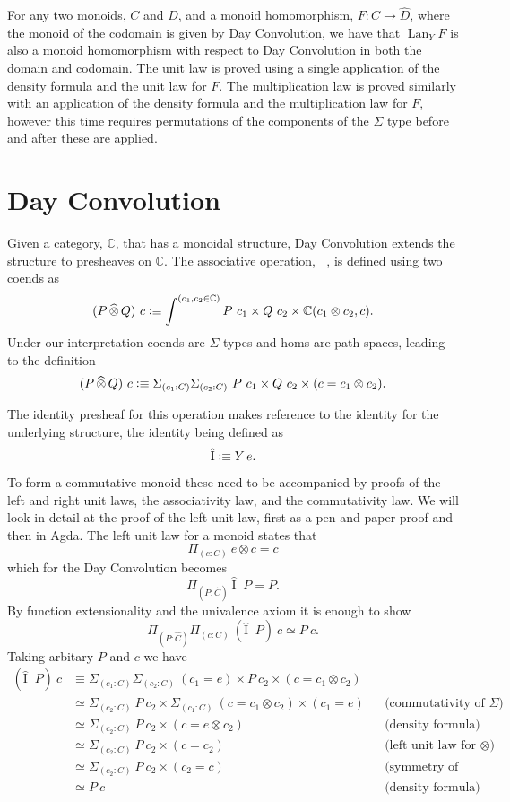 \documentclass[12pt, parskip, DIV=14]{scrbook}
\newcommand{\defeq}{\vcentcolon\equiv}
\DeclareMathOperator\daytensor{\widehat\otimes}
\newcommand{\dayid}{\operatorname{\hat{I}}}
\newcommand{\Lan}{\operatorname{Lan}}
\begin{document}
For any two monoids, $C$ and $D$, and a monoid homomorphism, $F : C \to \widehat{D}$, where the monoid of the codomain is given by Day Convolution, we have that $\Lan_Y F$ is also a monoid homomorphism with respect to Day Convolution in both the domain and codomain. The unit law is proved using a single application of the density formula and the unit law for $F$. The multiplication law is proved similarly with an application of the density formula and the multiplication law for $F$, however this time requires permutations of the components of the $\Sigma$ type before and after these are applied.


\section{Day Convolution}
\label{sec:dayconv}

Given a category, $\mathbb{C}$, that has a monoidal structure, Day Convolution extends the structure to presheaves on $\mathbb{C}$. The associative operation, $\daytensor$, is defined using two coends as
$$(P \daytensor Q)~c \defeq \int^{(c_1 , c_2 \in \mathbb{C})} P~c_1 \times Q~c_2 \times \mathbb{C}(c_1 \otimes c_2 , c).$$
Under our interpretation coends are $\Sigma$ types and homs are path spaces, leading to the definition
$$(P \daytensor Q)~c \defeq \Sigma_{(c_1 : C)}\Sigma_{(c_2 : C)}~P~c_1 \times Q~c_2 \times (c = c_1 \otimes c_2).$$

The identity presheaf for this operation makes reference to the identity for the underlying structure, the identity being defined as $$\dayid \defeq Y\,e.$$

To form a commutative monoid these need to be accompanied by proofs of the left and right unit laws, the associativity law, and the commutativity law. We will look in detail at the proof of the left unit law, first as a pen-and-paper proof and then in Agda. The left unit law for a monoid states that
$$\Pi_{(c : C)}~e \otimes c = c$$
which for the Day Convolution becomes
$$\Pi_{(P : \widehat{C})}~\dayid \daytensor P = P.$$ By function extensionality and the univalence axiom it is enough to show
$$\Pi_{(P : \widehat{C})}\Pi_{(c : C)}~(\dayid \daytensor P)~c \simeq P~c.$$ Taking arbitary $P$ and $c$ we have
\begin{align*}
  (\dayid \daytensor P)~c &\equiv \Sigma_{(c_1 : C)}\Sigma_{(c_2 : C)}~(c_1 = e) \times P~c_2 \times (c = c_1 \otimes c_2) \\
  &\simeq \Sigma_{(c_2 : C)}~P~c_2 \times \Sigma_{(c_1 : C)}~(c = c_1 \otimes c_2) \times (c_1 = e) &&\text{(commutativity of $\Sigma$)} \\
  &\simeq \Sigma_{(c_2 : C)}~P~c_2 \times (c = e \otimes c_2) &&\text{(density formula)} \\
  &\simeq \Sigma_{(c_2 : C)}~P~c_2 \times (c = c_2) &&\text{(left unit law for $\otimes$)} \\
  &\simeq \Sigma_{(c_2 : C)}~P~c_2 \times (c_2 = c) &&\text{(symmetry of paths)} \\
  &\simeq P~c &&\text{(density formula)}
\end{align*}
\end{document}
